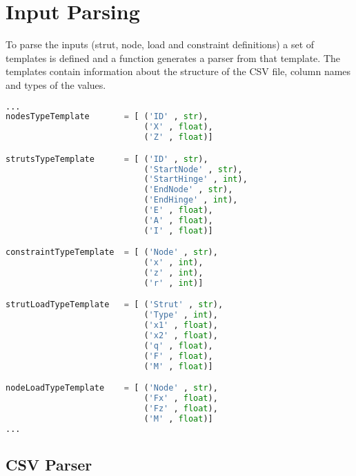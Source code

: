 \pagebreak

\section{Input Parsing}
\label{sec:inputpars}

To parse the inputs (strut, node, load and constraint definitions) a set of templates is defined and a function generates a parser from that template.
The templates contain information about the structure of the CSV file, column names and types of the values.

\begin{inconsolata}
\begin{minipage}{\linewidth}
\begin{lstlisting}[language=python]
...
nodesTypeTemplate       = [ ('ID' , str),
                            ('X' , float),
                            ('Z' , float)]

strutsTypeTemplate      = [ ('ID' , str),
                            ('StartNode' , str),
                            ('StartHinge' , int),
                            ('EndNode' , str),
                            ('EndHinge' , int),
                            ('E' , float),
                            ('A' , float),
                            ('I' , float)]

constraintTypeTemplate  = [ ('Node' , str),
                            ('x' , int),
                            ('z' , int),
                            ('r' , int)]

strutLoadTypeTemplate   = [ ('Strut' , str),
                            ('Type' , int),
                            ('x1' , float),
                            ('x2' , float),
                            ('q' , float),
                            ('F' , float),
                            ('M' , float)]

nodeLoadTypeTemplate    = [ ('Node' , str),
                            ('Fx' , float),
                            ('Fz' , float),
                            ('M' , float)]
...
\end{lstlisting}
\end{minipage}
\end{inconsolata}

\pagebreak

\subsection{CSV Parser}
\label{sec:csvparse}

